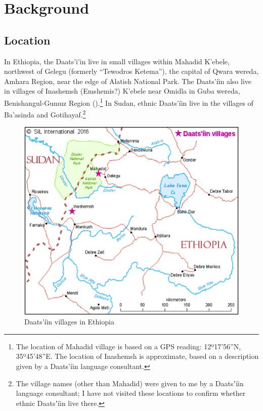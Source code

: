 \documentclass[output=paper]{langsci/langscibook}
\begin{document}
\section{Background}\label{sec:ahlandc:2}

\subsection{Location}\label{sec:ahlandc:2.1}

In Ethiopia, the Daats’i\'{ }in live in small villages within Mahadid K’ebele, northwest of Gelegu (formerly “Tewodros Ketema”), the capital of Qwara wereda, Amhara Region, near the edge of Alatish National Park. The Daats'\'{i}in also live in villages of Inashemsh (Emshemis?) K’ebele near Omidla in Guba wereda, Benishangul-Gumuz Region ().\footnote{The location of Mahadid village is based on a GPS reading: 12º17'56''N, 35º45'48''E.  The location of Inashemsh is approximate, based on a description given by a Daats’\'{i}in language consultant.} In Sudan, ethnic Daats’\'{i}in live in the villages of Ba’asinda and Gotihayaf.\footnote{The village names (other than Mahadid) were given to me by a Daatsʼ\'{i}in language consultant; I have not visited these locations to confirm whether ethnic Daatsʼ\'{i}in live there. }

 
\begin{figure}
\includegraphics{figures/AhlandCDaatsiintemplate-img1.png}
\caption{Daats’\'{i}in villages in Ethiopia}
\label{fig:ahlandc:1}
\end{figure}
\end{document}
